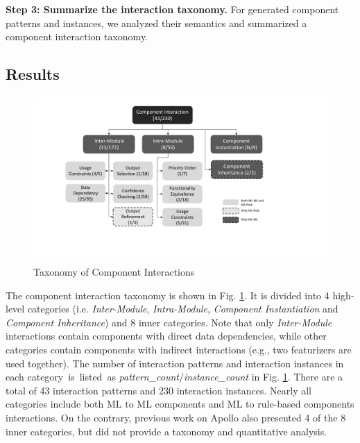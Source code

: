 \textbf{Step 3: Summarize the interaction taxonomy.} For generated component patterns and instances, we analyzed their semantics and summarized a component interaction taxonomy.

\subsection{Results}
\begin{figure}[!t]
    \centering
    \includegraphics[scale=0.38]{figs/component_interaction.pdf}
    \caption{Taxonomy of Component Interactions}
    \label{component_interaction_fig}
\end{figure}

The component interaction taxonomy is shown in Fig. \ref{component_interaction_fig}. It is divided into 4 high-level categories (i.e. \textit{Inter-Module}, \textit{Intra-Module}, \textit{Component Instantiation} and \textit{Component Inheritance}) and 8 inner categories. 
Note that only \textit{Inter-Module} interactions contain components with direct data dependencies, while other categories contain components with indirect interactions (e.g., two featurizers are used together). The number of interaction patterns and interaction instances in each category~is~listed~as \textit{pattern\_count}/\textit{instance\_count} in Fig. \ref{component_interaction_fig}. There are a total of 43 interaction patterns and 230 interaction instances.
Nearly all categories include both ML to ML components and ML to rule-based components interactions. On the contrary, previous work on Apollo \cite{pengFirstLookIntegration2020} also presented 4 of the 8 inner categories, but did not provide a taxonomy and quantitative analysis. 


